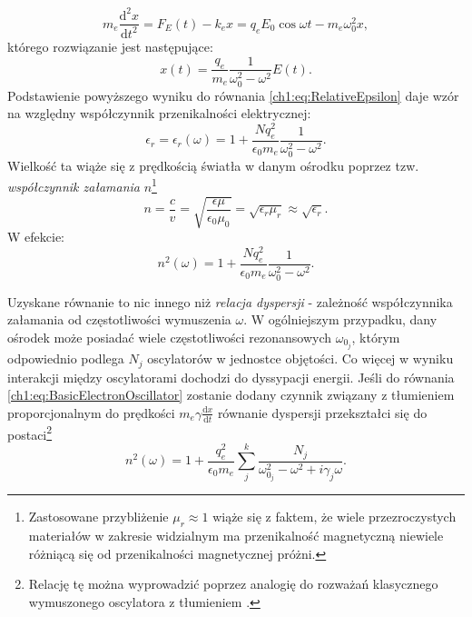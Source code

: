\begin{equation}
m_e\frac{\mathrm{d^2}x}{\mathrm{d}t^2} = F_E(t) - k_ex = q_eE_0\cos\omega t - m_e\omega_0^2x,
\label{ch1:eq:BasicElectronOscillator}
\end{equation}
którego rozwiązanie jest następujące:
\begin{equation}
x(t) = \frac{q_e}{m_e}\frac{1}{\omega_0^2 - \omega^2 }E(t).
\end{equation}
Podstawienie powyższego wyniku do równania \eqref{ch1:eq:RelativeEpsilon} daje wzór na względny współczynnik przenikalności elektrycznej:
\begin{equation}
\epsilon_r = \epsilon_r(\omega) = 1 + \frac{Nq_e^2}{\epsilon_0m_e}\frac{1}{\omega_0^2 - \omega^2}.
\label{ch1:eq:GeneralRelativeEpsilon}
\end{equation}
Wielkość ta wiąże się z prędkością światła w danym ośrodku poprzez tzw. \textit{współczynnik załamania} $n$\footnote{Zastosowane przybliżenie $\mu_r\approx 1$ wiąże się z faktem, że wiele przezroczystych materiałów w zakresie widzialnym ma przenikalność magnetyczną niewiele różniącą się od przenikalności magnetycznej próżni.}
\begin{equation}
n = \frac{c}{v} = \sqrt{\frac{\epsilon\mu}{\epsilon_0\mu_0}} = \sqrt{\epsilon_r\mu_r}\approx\sqrt{\epsilon_r}.
\end{equation}
W efekcie:
\begin{equation}
n^2(\omega) = 1 + \frac{Nq_e^2}{\epsilon_0m_e}\frac{1}{\omega_0^2 - \omega^2}.
\label{ch1:eq:RefractionCoeff}
\end{equation}

Uzyskane równanie to nic innego niż \textit{relacja dyspersji} - zależność współczynnika załamania od częstotliwości wymuszenia $\omega$. W ogólniejszym przypadku, dany ośrodek może posiadać wiele częstotliwości rezonansowych $\omega_{0_j}$, którym odpowiednio podlega $N_j$ oscylatorów w jednostce objętości. Co więcej w wyniku interakcji między oscylatorami dochodzi do dyssypacji energii. Jeśli do równania \eqref{ch1:eq:BasicElectronOscillator} zostanie dodany czynnik związany z tłumieniem proporcjonalnym do prędkości $m_e\gamma\frac{\mathrm{d}x}{\mathrm{d}t}$ równanie dyspersji przekształci się do postaci\footnote{Relację tę można wyprowadzić poprzez analogię do rozważań klasycznego wymuszonego oscylatora z tłumieniem \cite{RUBINOWICZ_KROLIKOWSKI}.}
\begin{equation}
n^2(\omega) = 1 + \frac{q_e^2}{\epsilon_0m_e}\sum_j^k\frac{N_j}{\omega_{0_j}^2 - \omega^2 + i\gamma_j\omega}.
\label{ch1:eq:GeneralRefractionCoeff}
\end{equation}

